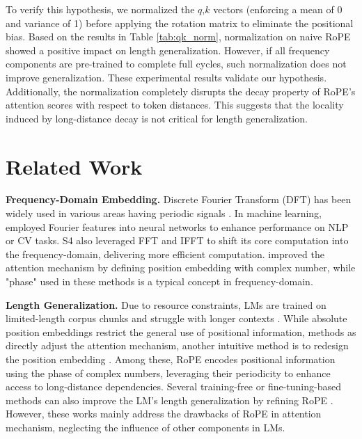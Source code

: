 To verify this hypothesis, we normalized the $q$,$k$ vectors (enforcing a mean of 0 and variance of 1) before applying the rotation matrix to eliminate the positional bias. Based on the results in Table \ref{tab:qk_norm}, normalization on naive RoPE showed a positive impact on length generalization. However, if all frequency components are pre-trained to complete full cycles, such normalization does not improve generalization. These experimental results validate our hypothesis.
Additionally, the normalization completely disrupts the decay property of RoPE's attention scores with respect to token distances. This suggests that the locality induced by long-distance decay is not critical for length generalization.

\section{Related Work}
\textbf{Frequency-Domain Embedding.}
Discrete Fourier Transform (DFT) \citep{oppenheim1982signal} has been widely used in various areas having periodic signals \citep{edfors2000analysis, sanchez2010cluster}.
In machine learning, \citep{uteuliyeva2020fourier, lin2024cyclenet, tancik2020fourier, tamkin2020language, lee2022fnet, gillman2024fourier} employed Fourier features into neural networks to enhance performance on NLP or CV tasks.
S4 \citep{gu2021efficiently} also leveraged FFT and IFFT to shift its core computation into the frequency-domain, delivering more efficient computation.
\citep{wang2019encoding, su2024roformer} improved the attention mechanism by defining position embedding with complex number, while "phase" used in these methods is a typical concept in frequency-domain.

\textbf{Length Generalization.}
Due to resource constraints, LMs are trained on limited-length corpus chunks and struggle with longer contexts \citep{voita2023neurons, dong2024exploring, hong2024token}.
While absolute position embeddings \citep{vaswani2017attention} restrict the general use of positional information, methods as \citep{shaw2018self, yang2019xlnet} directly adjust the attention mechanism, 
another intuitive method is to redesign the position embedding \citep{press2021train, chi2022kerple, kazemnejad2024impact, su2024roformer, wang2024length, choromanski2024learning}. 
Among these, RoPE \citep{su2024roformer} encodes positional information using the phase of complex numbers, leveraging their periodicity to enhance access to long-distance dependencies.
Several training-free or fine-tuning-based methods can also improve the LM's length generalization by refining RoPE \citep{peng2023yarn,chen2024clex,jin2024llm,lin2024mixture}. However, these works mainly address the drawbacks of RoPE in attention mechanism, neglecting the influence of other components in LMs.

